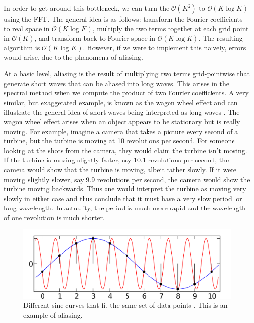 In order to get around this bottleneck, we can turn the $\mathcal{O}(K^{2})$ to $\mathcal{O}(K\log K)$ using the FFT. The general idea is as follows: transform the Fourier coefficients to real space in $\mathcal{O}(K\log K)$, multiply the two terms together at each grid point in $\mathcal{O}(K)$, and transform back to Fourier space in $\mathcal{O}(K\log K)$. The resulting algorithm is $\mathcal{O}(K\log K)$. However, if we were to implement this naively, errors would arise, due to the phenomena of aliasing. 

At a basic level, aliasing is the result of multiplying two terms grid-pointwise that generate short waves that can be aliased into long waves. This arises in the spectral method when we compute the product of two Fourier coefficients. A very similar, but exaggerated example, is known as the wagon wheel effect and can illustrate the general idea of short waves being interpreted as long waves \cite{wagonwheel}.  The wagon wheel effect arises when an object appears to be stationary but is really moving. For example, imagine a camera that takes a picture every second of a turbine, but the turbine is moving at 10 revolutions per second. For someone looking at the shots from the camera, they would claim the turbine isn't moving. If the turbine is moving slightly faster, say 10.1 revolutions per second, the camera would show that the turbine is moving, albeit rather slowly. If it were moving slightly slower, say 9.9 revolutions per second, the camera would show the turbine moving backwards. Thus one would interpret the turbine as moving very slowly in either case and thus conclude that it must have a very slow period, or long wavelength. In actuality, the period is much more rapid and the wavelength of one revolution is much shorter.  
\begin{figure}
\begin{center}
\includegraphics[width=\textwidth]{aliassine.pdf}
\caption{Different sine curves that fit the same set of data points \cite{sinewiki}. This is an example of aliasing.}
\label{aliassine}
\end{center}
\end{figure}

